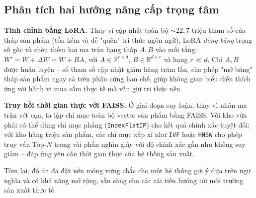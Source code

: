 \subsection{Phân tích hai hướng nâng cấp trọng tâm}

\textbf{Tinh chỉnh bằng LoRA.} Thay vì cập nhật toàn bộ $\sim 22{,}7$ triệu tham số
của tháp sản phẩm (tốn kém và dễ "quên" tri thức ngôn ngữ), LoRA \textit{đóng băng}
trọng số gốc và chèn thêm hai ma trận hạng thấp $A, B$ vào mỗi tầng:
$W' = W + \Delta W = W + BA$, với $A \in \mathbb{R}^{r \times d}$,
$B \in \mathbb{R}^{d \times r}$ và hạng $r \ll d$. Chỉ $A, B$ được huấn luyện -- số
tham số cập nhật giảm hàng trăm lần, cho phép "mở băng" tháp sản phẩm ngay cả trên
phần cứng hạn chế, giúp không gian biểu diễn thích ứng với hành vi mua sắm thực tế
mà vẫn giữ tri thức nền.

\textbf{Truy hồi thời gian thực với FAISS.} Ở giai đoạn suy luận, thay vì nhân ma
trận vét cạn, ta lập chỉ mục toàn bộ vector sản phẩm bằng FAISS. Với kho vừa phải có
thể dùng chỉ mục phẳng (\texttt{IndexFlatIP}) cho kết quả chính xác tuyệt đối; với
kho hàng triệu sản phẩm, các chỉ mục xấp xỉ như \texttt{IVF} hoặc \texttt{HNSW} cho
phép truy vấn Top-$N$ trong vài phần nghìn giây với độ chính xác gần như không suy
giảm -- đáp ứng yêu cầu thời gian thực của hệ thống sản xuất.

Tóm lại, đồ án đã đặt nền móng vững chắc cho một hệ thống gợi ý dựa trên ngữ nghĩa và
có khả năng mở rộng, sẵn sàng cho các cải tiến hướng tới môi trường sản xuất thực tế.
